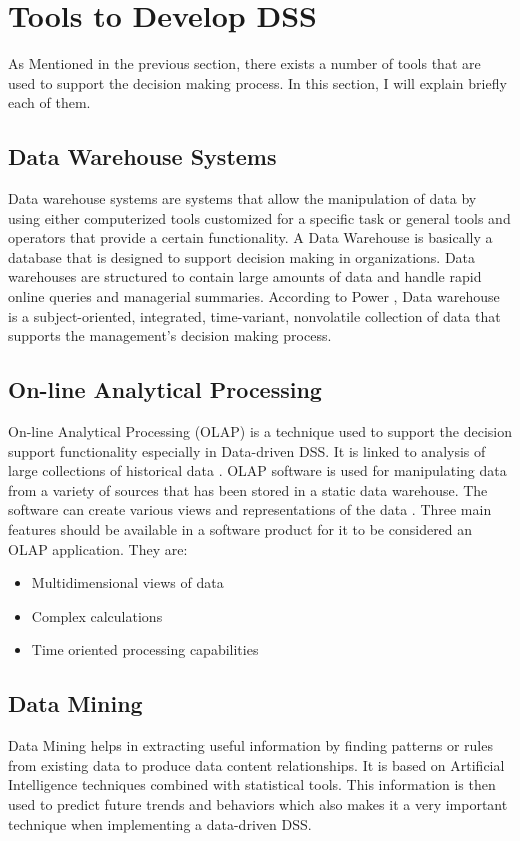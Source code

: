 \section{Tools to Develop DSS}
\label{sec:ToolsToDevelopDSS}
As Mentioned in the previous section, there exists a number of tools that are used to support the decision making process. In this section, I will explain briefly each of them.
\subsection{Data Warehouse Systems}
\indent Data warehouse systems are systems that allow the manipulation of data by using either computerized tools customized for a specific task or general tools and operators that provide a certain functionality. A Data Warehouse is basically a database that is designed to support decision making in organizations. Data warehouses are structured to contain large amounts of data and handle rapid online queries and managerial summaries. According to Power \cite{power2007brief}, Data warehouse is a subject-oriented, integrated, time-variant, nonvolatile collection of data that supports the management's decision making process.
\subsection{On-line Analytical Processing}
\indent On-line Analytical Processing (OLAP) is a technique used to support the decision support functionality especially in Data-driven DSS. It is linked to analysis of large collections of historical data \cite{DDSTypes}. OLAP software is used for manipulating data from a variety of sources that has been stored in a static data warehouse. The software can create various views and representations of the data \cite{DDSTypes}. Three main features should be available in a software product for it to be considered an OLAP application. They are: 
\begin{itemize}
\item Multidimensional views of data
\item Complex calculations
\item Time oriented processing capabilities
\end{itemize}
\subsection{Data Mining}
\indent Data Mining helps in extracting useful information by finding patterns or rules from existing data to produce data content relationships. It is based on Artificial Intelligence techniques combined with statistical tools. This information is then used to predict future trends and behaviors which also makes it a very important technique when implementing a data-driven DSS.
